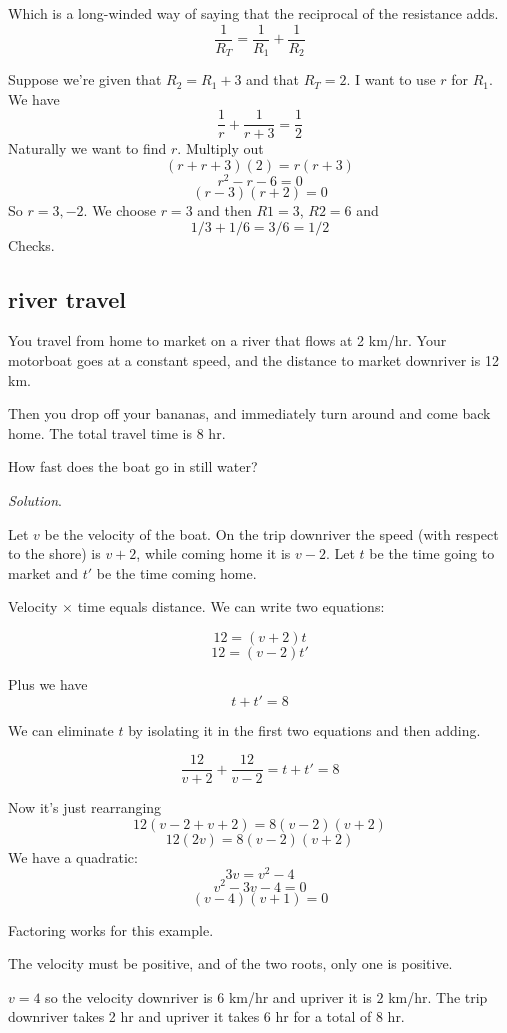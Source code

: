 \documentclass[11pt, oneside]{article}
\begin{document}
Which is a long-winded way of saying that the reciprocal of the resistance adds.
\[ \frac{1}{R_T} = \frac{1}{R_1} + \frac{1}{R_2} \]

Suppose we're given that $R_2 = R_1 + 3$ and that $R_T = 2$.  I want to use $r$ for $R_1$.  We have
\[ \frac{1}{r} + \frac{1}{r+3} = \frac{1}{2} \]
Naturally we want to find $r$.  Multiply out
\[ (r + r + 3)(2) = r(r + 3) \]
\[ r^2 -r - 6 = 0 \]
\[ (r-3)(r+2) = 0 \]
So $r = 3, -2$.  We choose $r = 3$ and then $R1 = 3$, $R2 = 6$ and
\[ 1/3 + 1/6 = 3/6 = 1/2 \]
Checks.

\subsection*{river travel}

You travel from home to market on a river that flows at 2 km/hr.  Your motorboat goes at a constant speed, and the distance to market downriver is 12 km.

Then you drop off your bananas, and immediately turn around and come back home.  The total travel time is 8 hr.  

How fast does the boat go in still water?

\emph{Solution}.

Let $v$ be the velocity of the boat.  On the trip downriver the speed (with respect to the shore) is $v + 2$, while coming home it is $v - 2$.  Let $t$ be the time going to market and $t'$ be the time coming home.

Velocity $\times$ time equals distance.  We can write two equations:

\[ 12 = (v + 2) t \]
\[ 12 = (v - 2) t' \]

Plus we have
\[ t + t' = 8 \]

We can eliminate $t$ by isolating it in the first two equations and then adding.

\[ \frac{12}{v+2} + \frac{12}{v-2}= t + t' = 8 \]

Now it's just rearranging
\[ 12(v - 2 + v + 2) = 8(v - 2)(v + 2) \]
\[ 12(2v) = 8(v - 2)(v + 2) \]
We have a quadratic:
\[ 3v = v^2 - 4 \]
\[ v^2 - 3v - 4 = 0 \]
\[ (v - 4)(v + 1) = 0 \]

Factoring works for this example.  

The velocity must be positive, and of the two roots, only one is positive.  

$v = 4$ so the velocity downriver is $6$ km/hr and upriver it is $2$ km/hr.  The trip downriver takes 2 hr and upriver it takes 6 hr for a total of 8 hr.
\end{document}
